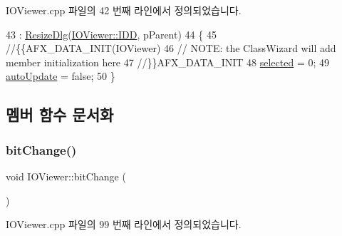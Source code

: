 I\+O\+Viewer.\+cpp 파일의 42 번째 라인에서 정의되었습니다.


\begin{DoxyCode}
43   : \mbox{\hyperlink{class_resize_dlg_a87bab778e9312f274ebe750d4c3a67ee}{ResizeDlg}}(\mbox{\hyperlink{class_i_o_viewer_ae3a0a931b85052266f471555982f4467a7633883737de956634100664f047c319}{IOViewer::IDD}}, pParent)
44 \{
45   \textcolor{comment}{//\{\{AFX\_DATA\_INIT(IOViewer)}
46   \textcolor{comment}{// NOTE: the ClassWizard will add member initialization here}
47   \textcolor{comment}{//\}\}AFX\_DATA\_INIT}
48   \mbox{\hyperlink{class_i_o_viewer_a418dd29c924f6fa180e995ba9db8399c}{selected}} = 0;
49   \mbox{\hyperlink{class_i_o_viewer_a6f3bc2241e369ffba682365f58412dc7}{autoUpdate}} = \textcolor{keyword}{false};
50 \}
\end{DoxyCode}


\subsection{멤버 함수 문서화}
\mbox{\label{class_i_o_viewer_af0c313447ad43d835f1eeca938bfd759}} 
\subsubsection{\texorpdfstring{bit\+Change()}{bitChange()}}
{\footnotesize\ttfamily void I\+O\+Viewer\+::bit\+Change (\begin{DoxyParamCaption}{ }\end{DoxyParamCaption})}



I\+O\+Viewer.\+cpp 파일의 99 번째 라인에서 정의되었습니다.


